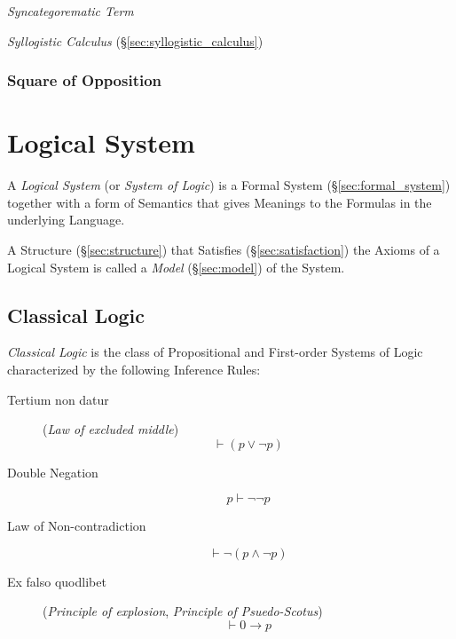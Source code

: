 \emph{Syncategorematic Term}

\emph{Syllogistic Calculus} (\S\ref{sec:syllogistic_calculus})



\subsubsection{Square of Opposition}\label{sec:square_of_opposition}



\section{Logical System}\label{sec:logical_system}

A \emph{Logical System} (or \emph{System of Logic}) is a Formal System
(\S\ref{sec:formal_system}) together with a form of Semantics that
gives Meanings to the Formulas in the underlying Language.

A Structure (\S\ref{sec:structure}) that Satisfies
(\S\ref{sec:satisfaction}) the Axioms of a Logical System is called a
\emph{Model} (\S\ref{sec:model}) of the System.



\subsection{Classical Logic}\label{sec:classical_logic}

\emph{Classical Logic} is the class of Propositional and
First-order Systems of Logic characterized by the following Inference
Rules:

\begin{description}

\item [Tertium non datur] (\emph{Law of excluded middle})
  \[
    \vdash(p \vee \neg p)
  \]

\item [Double Negation]
  \[
    p \vdash \neg\neg p
  \]

\item [Law of Non-contradiction]
  \[
    \vdash \neg(p \wedge \neg p)
  \]

\item [Ex falso quodlibet] (\emph{Principle of explosion},
  \emph{Principle of Psuedo-Scotus})
  \[
    \vdash 0 \rightarrow p
  \]


\end{description}

